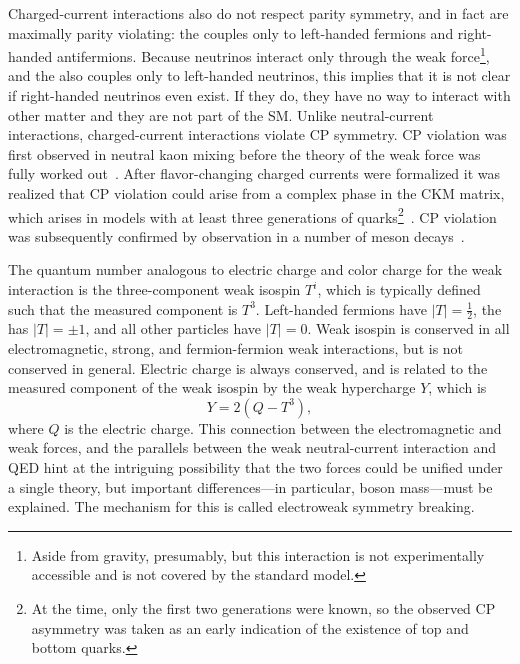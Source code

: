Charged-current interactions also do not respect parity symmetry, and in fact are maximally parity violating: the {\PW} couples only to left-handed fermions and right-handed antifermions.
Because neutrinos interact only through the weak force\footnote{Aside from gravity, presumably, but this interaction is not experimentally accessible and is not covered by the standard model.}, and the {\PZ} also couples only to left-handed neutrinos, this implies that it is not clear if right-handed neutrinos even exist.
If they do, they have no way to interact with other matter and they are not part of the SM\@.
Unlike neutral-current interactions, charged-current interactions violate CP symmetry.
CP violation was first observed in neutral kaon mixing before the theory of the weak force was fully worked out~\cite{PhysRevLett.13.138}.
After flavor-changing charged currents were formalized it was realized that CP violation could arise from a complex phase in the CKM matrix, which arises in models with at least three generations of quarks\footnote{At the time, only the first two generations were known, so the observed CP asymmetry was taken as an early indication of the existence of top and bottom quarks.}~\cite{doi:10.1143/PTP.49.652}.
CP violation was subsequently confirmed by observation in a number of meson decays~\cite{AlaviHarati:1999xp,Fanti:1999nm,Aubert:2001sp,Abe:2001xe,Aaij:2012kz,Aaij:2013iua}.

The quantum number analogous to electric charge and color charge for the weak interaction is the three-component weak isospin $T^i$, which is typically defined such that the measured component is $T^3$.
Left-handed fermions have $\lvert T \rvert = \frac{1}{2}$, the {\PWpm} has $\lvert T \rvert = \pm 1$, and all other particles have $\lvert T \rvert = 0$.
Weak isospin is conserved in all electromagnetic, strong, and fermion-fermion weak interactions, but is not conserved in general.
Electric charge is always conserved, and is related to the measured component of the weak isospin by the weak hypercharge $Y$, which is
\begin{equation}
  Y = 2\left(Q - T^3\right),
\end{equation}
where $Q$ is the electric charge.
This connection between the electromagnetic and weak forces, and the parallels between the weak neutral-current interaction and QED hint at the intriguing possibility that the two forces could be unified under a single theory, but important differences---in particular, boson mass---must be explained.
The mechanism for this is called electroweak symmetry breaking.



